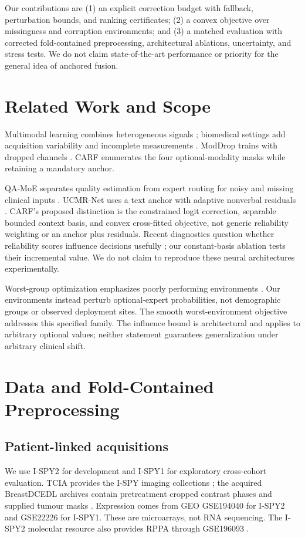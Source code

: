\documentclass[runningheads]{llncs}
\begin{document}
Our contributions are (1) an explicit correction budget with fallback, perturbation bounds, and ranking certificates; (2) a convex objective over missingness and corruption environments; and (3) a matched evaluation with corrected fold-contained preprocessing, architectural ablations, uncertainty, and stress tests. We do not claim state-of-the-art performance or priority for the general idea of anchored fusion.

\section{Related Work and Scope}
Multimodal learning combines heterogeneous signals \cite{baltrusaitis2019}; biomedical settings add acquisition variability and incomplete measurements \cite{acosta2022}. ModDrop trains with dropped channels \cite{neverova2015}. CARF enumerates the four optional-modality masks while retaining a mandatory anchor.

QA-MoE separates quality estimation from expert routing for noisy and missing clinical inputs \cite{sun2026}. UCMR-Net uses a text anchor with adaptive nonverbal residuals \cite{tang2026}. CARF's proposed distinction is the constrained logit correction, separable bounded context basis, and convex cross-fitted objective, not generic reliability weighting or an anchor plus residuals. Recent diagnostics question whether reliability scores influence decisions usefully \cite{moon2026}; our constant-basis ablation tests their incremental value. We do not claim to reproduce these neural architectures experimentally.

Worst-group optimization emphasizes poorly performing environments \cite{sagawa2020}. Our environments instead perturb optional-expert probabilities, not demographic groups or observed deployment sites. The smooth worst-environment objective addresses this specified family. The influence bound is architectural and applies to arbitrary optional values; neither statement guarantees generalization under arbitrary clinical shift.

\section{Data and Fold-Contained Preprocessing}
\subsection{Patient-linked acquisitions}
We use I-SPY2 for development and I-SPY1 for exploratory cross-cohort evaluation. TCIA provides the I-SPY imaging collections \cite{tciaispy1,tciaispy2}; the acquired BreastDCEDL archives contain pretreatment cropped contrast phases and supplied tumour masks \cite{fridman2026}. Expression comes from GEO GSE194040 for I-SPY2 and GSE22226 for I-SPY1. These are microarrays, not RNA sequencing. The I-SPY2 molecular resource also provides RPPA through GSE196093 \cite{wolf2022ispy}.
\end{document}
